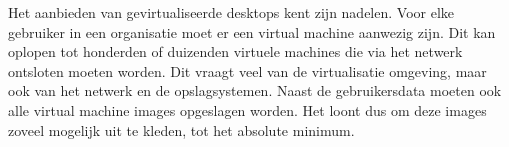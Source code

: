 Het aanbieden van gevirtualiseerde desktops kent zijn nadelen. Voor elke gebruiker in een organisatie moet er een virtual machine aanwezig zijn. Dit kan oplopen tot honderden of duizenden virtuele machines die via het netwerk ontsloten moeten worden. Dit vraagt veel van de virtualisatie omgeving, maar ook van het netwerk en de opslagsystemen. Naast de gebruikersdata moeten ook alle virtual machine images opgeslagen worden. Het loont dus om deze images zoveel mogelijk uit te kleden, tot het absolute minimum.


